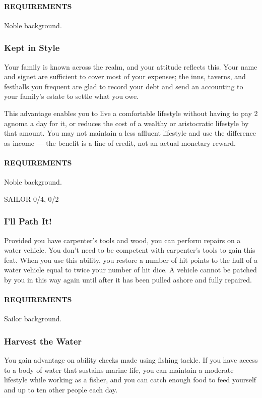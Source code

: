     \paragraph{REQUIREMENTS} Noble background.

    \subsubsection{Kept in Style} \label{feat::keptinstyle}
    Your family is known across the realm, and your attitude reflects this.
    Your name and signet are sufficient to cover most of your expenses; the inns, taverns, and festhalls you frequent are glad to record your debt and send an accounting to your family's estate to settle what you owe.

    This advantage enables you to live a comfortable lifestyle without having to pay 2 agnoma a day for it, or reduces the cost of a wealthy or aristocratic lifestyle by that amount.
    You may not maintain a less affluent lifestyle and use the difference as income --- the benefit is a line of credit, not an actual monetary reward.
    \paragraph{REQUIREMENTS} Noble background.

SAILOR 0/4, 0/2
    \subsubsection{I'll Path It!} \label{feat::illpatchit}
    Provided you have carpenter's tools and wood, you can perform repairs on a water vehicle.
    You don't need to be competent with carpenter's tools to gain this feat.
    When you use this ability, you restore a number of hit points to the hull of a water vehicle equal to twice your number of hit dice.
    A vehicle cannot be patched by you in this way again until after it has been pulled ashore and fully repaired.
    \paragraph{REQUIREMENTS} Sailor background.

    \subsubsection{Harvest the Water} \label{feat::harvestthewater}
    You gain advantage on ability checks made using fishing tackle.
    If you have access to a body of water that sustains marine life, you can maintain a moderate lifestyle while working as a fisher, and you can catch enough food to feed yourself and up to ten other people each day.
